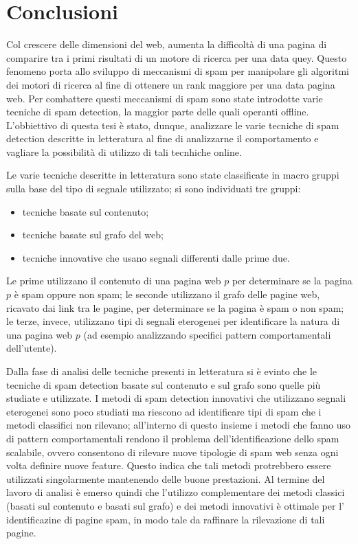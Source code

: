 \chapter{Conclusioni}

Col crescere delle dimensioni del web, aumenta la difficoltà di una pagina di comparire tra i primi risultati di un motore di ricerca per una data quey. Questo fenomeno porta allo sviluppo di meccanismi di spam per manipolare gli algoritmi dei motori di ricerca al fine di ottenere un rank maggiore per una data pagina web. Per combattere questi meccanismi di spam sono state introdotte varie tecniche di spam detection, la maggior parte delle quali operanti offline.\\
L'obbiettivo di questa tesi è stato, dunque, analizzare le  varie tecniche di spam detection descritte in letteratura al fine di analizzarne  il comportamento e vagliare la possibilità di utilizzo di tali tecnhiche online. 

Le varie tecniche descritte in letteratura sono state classificate in macro gruppi sulla base del tipo di segnale utilizzato; si sono individuati tre gruppi:
\begin{itemize}
 \item tecniche basate sul contenuto;
 \item tecniche basate sul grafo del web;
 \item tecniche innovative che usano segnali differenti dalle prime due. 
\end{itemize}
Le prime utilizzano il contenuto di una pagina web \(p\) per determinare se la pagina \(p\) è spam oppure non spam; le seconde utilizzano il grafo delle pagine web, ricavato dai link tra le pagine, per determinare se la pagina è spam o non spam; le terze, invece, utilizzano tipi di segnali eterogenei per identificare la natura di una pagina web \(p\) (ad esempio analizzando specifici pattern comportamentali dell'utente).

Dalla fase di analisi delle tecniche presenti in letteratura si è evinto che le tecniche di spam detection basate sul contenuto e sul grafo sono quelle più studiate e utilizzate. I metodi di spam detection innovativi che utilizzano segnali eterogenei sono poco studiati ma riescono ad identificare tipi di spam che i metodi classifici non rilevano; all'interno di questo insieme i metodi che fanno uso di pattern comportamentali rendono il problema dell’identificazione dello spam scalabile, ovvero consentono di rilevare nuove tipologie di spam web senza ogni volta definire nuove feature. Questo indica che tali metodi protrebbero essere utilizzati singolarmente mantenendo delle buone prestazioni. 
Al termine del lavoro di analisi è emerso quindi che l'utilizzo complementare dei metodi classici (basati sul contenuto e basati sul grafo) e dei metodi innovativi è ottimale per l' identificazine di pagine spam, in modo tale da raffinare la rilevazione di tali pagine.

